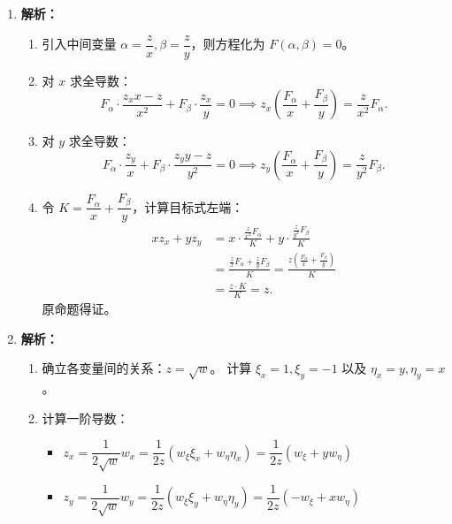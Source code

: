 \documentclass[lang=cn,11pt]{elegantbook}
\begin{document}
\begin{solution}
\begin{enumerate}
  \item[(1)] \textbf{解析：}
  \begin{enumerate}
      \item 引入中间变量 $\alpha = \dfrac{z}{x}, \beta = \dfrac{z}{y}$，则方程化为 $F(\alpha, \beta) = 0$。
      \item 对 $x$ 求全导数：
      \[
      F_\alpha \cdot \frac{z_x x - z}{x^2} + F_\beta \cdot \frac{z_x}{y} = 0 \implies z_x\left(\frac{F_\alpha}{x} + \frac{F_\beta}{y}\right) = \frac{z}{x^2}F_\alpha.
      \]
      \item 对 $y$ 求全导数：
      \[
      F_\alpha \cdot \frac{z_y}{x} + F_\beta \cdot \frac{z_y y - z}{y^2} = 0 \implies z_y\left(\frac{F_\alpha}{x} + \frac{F_\beta}{y}\right) = \frac{z}{y^2}F_\beta.
      \]
      \item 令 $K = \dfrac{F_\alpha}{x} + \dfrac{F_\beta}{y}$，计算目标式左端：
      \begin{align*}
      x z_x + y z_y &= x \cdot \frac{\frac{z}{x^2}F_\alpha}{K} + y \cdot \frac{\frac{z}{y^2}F_\beta}{K} \\[6pt]
      &= \frac{\frac{z}{x}F_\alpha + \frac{z}{y}F_\beta}{K} = \frac{z\left(\frac{F_\alpha}{x} + \frac{F_\beta}{y}\right)}{K} \\[6pt]
      &= \frac{z \cdot K}{K} = z.
      \end{align*}
      原命题得证。
  \end{enumerate}

  \item[(2)] \textbf{解析：}
  \begin{enumerate}
      \item 确立各变量间的关系：$z = \sqrt{w}$。
      计算 $\xi_x = 1, \xi_y = -1$ 以及 $\eta_x = y, \eta_y = x$。
      
      \item 计算一阶导数：
      \begin{itemize}
          \item $z_x = \dfrac{1}{2\sqrt{w}} w_x = \dfrac{1}{2z} (w_\xi \xi_x + w_\eta \eta_x) = \dfrac{1}{2z} (w_\xi + y w_\eta)$
          \item $z_y = \dfrac{1}{2\sqrt{w}} w_y = \dfrac{1}{2z} (w_\xi \xi_y + w_\eta \eta_y) = \dfrac{1}{2z} (-w_\xi + x w_\eta)$
      \end{itemize}
      

\end{enumerate}
\end{enumerate}
\end{solution}
\end{document}
